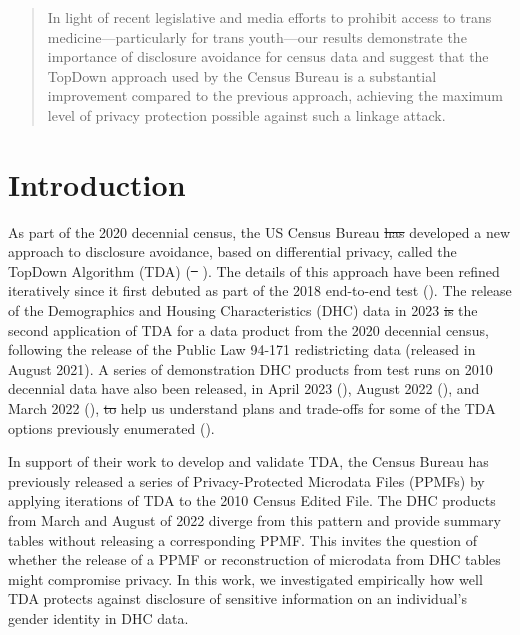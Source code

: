 \documentclass{jpc} %
\theoremstyle{plain}\newtheorem{satz}[thm]{Satz} %
\providecommand{\DIFaddtex}[1]{{\protect\color{blue}\uwave{#1}}} %
\providecommand{\DIFdeltex}[1]{{\protect\color{red}\sout{#1}}}                      %
\providecommand{\DIFaddbegin}{} %
\providecommand{\DIFaddend}{} %
\providecommand{\DIFdelbegin}{} %
\providecommand{\DIFdelend}{} %
\providecommand{\DIFadd}[1]{\texorpdfstring{\DIFaddtex{#1}}{#1}} %
\providecommand{\DIFdel}[1]{\texorpdfstring{\DIFdeltex{#1}}{}} %
\begin{document}
\begin{abstract}
  In light of recent legislative and media efforts to prohibit access to trans medicine---particularly for trans youth---our results demonstrate the importance of disclosure avoidance for census data and suggest that the TopDown approach used by the Census Bureau is a substantial improvement compared to the previous approach, achieving the maximum level of privacy protection possible against such a linkage attack.
\end{abstract}

\maketitle

\section*{Introduction}\label{S:one}

As part of the 2020 decennial census, the US Census Bureau \DIFdelbegin \DIFdel{has }\DIFdelend developed a new approach to disclosure avoidance, based on differential privacy, called the TopDown Algorithm (TDA) (\DIFdelbegin \DIFdel{\mbox{%
\cite{abowd2019census}}\hskip0pt%
}\DIFdelend \DIFaddbegin \DIFadd{\mbox{%
\cite{Abowd20222020}}\hskip0pt%
}\DIFaddend ).  The details of this approach have been refined iteratively since it first debuted as part of the 2018 end-to-end test (\cite{garfinkel2019end}).  The release of the Demographics and Housing Characteristics (DHC) data in 2023 \DIFdelbegin \DIFdel{is }\DIFdelend \DIFaddbegin \DIFadd{was }\DIFaddend the second application of TDA for a data product from the 2020 decennial census, following the release of the Public Law 94-171 redistricting data (released in August 2021).  A series of  demonstration DHC products from test runs on 2010 decennial data have also been released, in April 2023 (\cite{census2023demonstration}), August 2022 (\cite{census2022bdemonstration}), and March 2022 (\cite{census2022demonstration}), \DIFdelbegin \DIFdel{to }\DIFdelend \DIFaddbegin \DIFadd{which }\DIFaddend help us understand plans and trade-offs for some of the TDA options previously enumerated  (\cite{petti2019differential}).

In support of their work to develop and validate TDA,  the Census Bureau has previously released a series of Privacy-Protected Microdata Files (PPMFs) by applying iterations of TDA to the 2010 Census Edited File.  The DHC products from March and August of 2022 diverge from this pattern and provide summary tables without releasing a corresponding PPMF.  This invites the question of whether the release of a PPMF or reconstruction of microdata from DHC tables might compromise privacy.  In this work, we investigated empirically how well TDA protects against disclosure of sensitive information on an individual's gender identity in DHC data.
\end{document}
